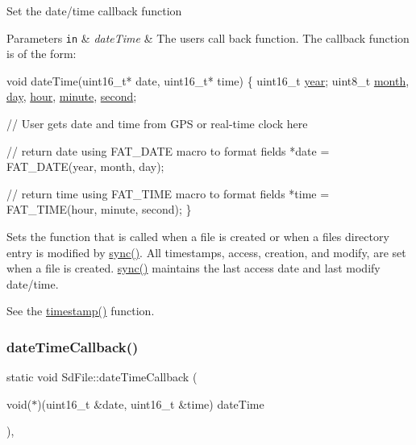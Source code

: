 Set the date/time callback function


\begin{DoxyParams}[1]{Parameters}
\mbox{\tt in}  & {\em date\+Time} & The user\textquotesingle{}s call back function. The callback function is of the form\+:\\
\hline
\end{DoxyParams}

\begin{DoxyCode}
\textcolor{keywordtype}{void} dateTime(uint16\_t* date, uint16\_t* time) \{
  uint16\_t \hyperlink{_time_8cpp_a98bf680dbfa28f79514ba50d33fee63f}{year};
  uint8\_t \hyperlink{_time_8cpp_a3f3be7ce4301fc1896efac6f0952f772}{month}, \hyperlink{_time_8cpp_a075786e0a525a2bba638889efcc42385}{day}, \hyperlink{_time_8cpp_a721ff0d06e8367ee5d2c5cf1a2c40ab5}{hour}, \hyperlink{_time_8cpp_adf618b3bac7dcfac69d4e1f5a68159b7}{minute}, \hyperlink{_time_8cpp_aed5657208944fe098e4e5f3380e0a1f9}{second};

  \textcolor{comment}{// User gets date and time from GPS or real-time clock here}

  \textcolor{comment}{// return date using FAT\_DATE macro to format fields}
  *date = FAT\_DATE(year, month, day);

  \textcolor{comment}{// return time using FAT\_TIME macro to format fields}
  *time = FAT\_TIME(hour, minute, second);
\}
\end{DoxyCode}


Sets the function that is called when a file is created or when a file\textquotesingle{}s directory entry is modified by \hyperlink{class_sd_file_a742d64ca964583ac3a92b31f0eba5e14}{sync()}. All timestamps, access, creation, and modify, are set when a file is created. \hyperlink{class_sd_file_a742d64ca964583ac3a92b31f0eba5e14}{sync()} maintains the last access date and last modify date/time.

See the \hyperlink{class_sd_file_a249632ba9580c556c0b041d6b2aaf224}{timestamp()} function. \mbox{\label{class_sd_file_a88a9b32bfec07c8c5cfdf8a36b7faf26}} 
\subsubsection{\texorpdfstring{date\+Time\+Callback()}{dateTimeCallback()}\hspace{0.1cm}{\footnotesize\ttfamily [2/2]}}
{\footnotesize\ttfamily static void Sd\+File\+::date\+Time\+Callback (\begin{DoxyParamCaption}\item[{void($\ast$)(uint16\+\_\+t \&date, uint16\+\_\+t \&time)}]{date\+Time }\end{DoxyParamCaption})\hspace{0.3cm}{\ttfamily [inline]}, {\ttfamily [static]}}

